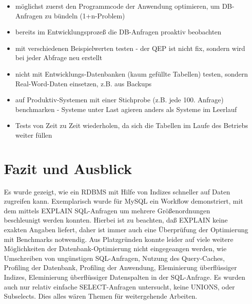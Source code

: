 \begin{itemize} 
	\item möglichst zuerst den Programmcode der Anwendung optimieren, um DB-Anfragen zu bündeln (1+n-Problem)
	\item bereits im Entwicklungsprozeß die DB-Anfragen proaktiv beobachten
	\item mit verschiedenen Beispielwerten testen - der QEP ist nicht fix, sondern wird bei jeder Abfrage neu erstellt
	\item nicht mit Entwicklungs-Datenbanken (kaum gefüllte Tabellen) testen, sondern Real-Word-Daten einsetzen, z.B. aus Backups
	\item auf Produktiv-Systemen mit einer Stichprobe (z.B. jede 100. Anfrage) benchmarken - Systeme unter Last agieren anders als Systeme im Leerlauf
	\item Tests von Zeit zu Zeit wiederholen, da sich die Tabellen im Laufe des Betriebs weiter füllen
\end{itemize}
\section{Fazit und Ausblick}
Es wurde gezeigt, wie ein RDBMS mit Hilfe von Indizes schneller auf Daten zugreifen kann.
Exemplarisch wurde für MySQL ein Workflow demonstriert, mit dem mittels EXPLAIN SQL-Anfragen um mehrere Größenordnungen beschleunigt werden konnten.
Hierbei ist zu beachten, daß EXPLAIN keine exakten Angaben liefert, daher ist immer auch eine Überprüfung der Optimierung mit Benchmarks notwendig.
Aus Platzgründen konnte leider auf viele weitere Möglichkeiten der Datenbank-Optimierung nicht eingegeangen werden, wie Umschreiben von ungünstigen SQL-Anfragen, Nutzung des Query-Caches, Profiling der Datenbank, Profiling der Anwendung, Eleminierung überflüssiger Indizes, Eleminierung überflüssiger Datenspalten in der SQL-Anfrage. 
Es wurden auch nur relativ einfache SELECT-Anfragen untersucht, keine UNIONS, oder Subselects.
Dies alles wären Themen für weitergehende Arbeiten.
